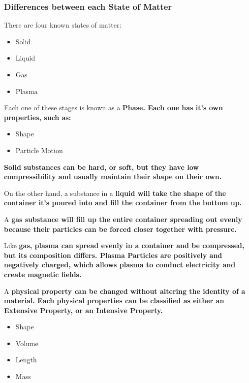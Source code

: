 
\subsubsection*{Differences between each State of Matter}

There are four known states of matter:

\begin{itemize}
    \item Solid
    \item Liquid
    \item Gas
    \item Plasma
\end{itemize}

\begin{definition}[Phase]
      Each one of these stages is known as a \bf{Phase}. Each one has it's own properties, such as:
    
      \begin{itemize}
            \item Shape
            \item Particle Motion
      \end{itemize}
\end{definition}

\bf{Solid substances} can be \bf{hard}, or \bf{soft}, but they have
low \bf{compressibility} and usually maintain their shape on their own.

On the other hand, a substance in a \bf{liquid} will take the shape of the
container it's poured into and fill the container from the \bf{bottom up}.

A \bf{gas substance} will fill up the entire container spreading out evenly
because their particles can be forced closer together with pressure.

Like \bf{gas}, \bf{plasma} can spread evenly in a container and be
compressed, but its composition differs. \bf{Plasma Particles} are
positively and negatively charged, which allows plasma to conduct electricity
and create magnetic fields.

A \bf{physical property} can be changed without altering the identity of a
material. Each physical properties can be classified as either an
\bf{Extensive Property}, or an
\bf{Intensive Property}.

\begin{itemize}
    \item Shape
    \item Volume
    \item Length
    \item Mass
\end{itemize}

